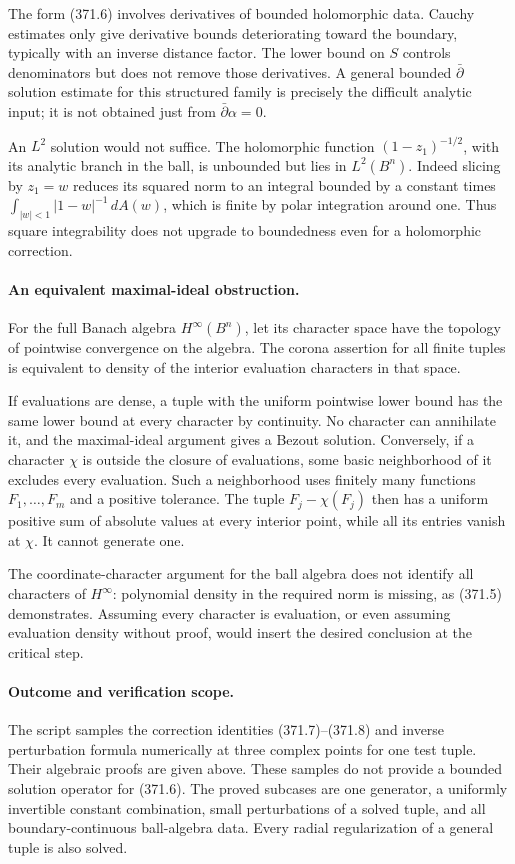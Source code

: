 \documentclass[11pt]{article}
\begin{document}
The form (371.6) involves derivatives of bounded holomorphic data.
Cauchy estimates only give derivative bounds deteriorating toward
the boundary, typically with an inverse distance factor. The
lower bound on $S$ controls denominators but does not remove
those derivatives. A general bounded $\bar\partial$ solution
estimate for this structured family is precisely the difficult
analytic input; it is not obtained just from
$\bar\partial\alpha=0$.

An $L^2$ solution would not suffice. The holomorphic function
$(1-z_1)^{-1/2}$, with its analytic branch in the ball, is
unbounded but lies in $L^2(B^n)$. Indeed slicing by $z_1=w$
reduces its squared norm to an integral bounded by a constant
times $\int_{|w|<1}|1-w|^{-1}\,dA(w)$, which is finite by
polar integration around one. Thus square integrability does
not upgrade to boundedness even for a holomorphic correction.

\paragraph{An equivalent maximal-ideal obstruction.}
For the full Banach algebra $H^\infty(B^n)$, let its character
space have the topology of pointwise convergence on the algebra.
The corona assertion for all finite tuples is equivalent to
density of the interior evaluation characters in that space.

If evaluations are dense, a tuple with the uniform pointwise
lower bound has the same lower bound at every character by
continuity. No character can annihilate it, and the maximal-ideal
argument gives a Bezout solution. Conversely, if a character
$\chi$ is outside the closure of evaluations, some basic
neighborhood of it excludes every evaluation. Such a neighborhood
uses finitely many functions $F_1,\ldots,F_m$ and a positive
tolerance. The tuple $F_j-\chi(F_j)$ then has a uniform positive
sum of absolute values at every interior point, while all its
entries vanish at $\chi$. It cannot generate one.

The coordinate-character argument for the ball algebra does not
identify all characters of $H^\infty$: polynomial density in
the required norm is missing, as (371.5) demonstrates. Assuming
every character is evaluation, or even assuming evaluation
density without proof, would insert the desired conclusion at
the critical step.

\paragraph{Outcome and verification scope.}
The script samples the correction identities (371.7)--(371.8)
and inverse perturbation formula numerically at three complex points
for one test tuple. Their algebraic proofs are given above.
These samples do not
provide a bounded solution operator for (371.6). The proved
subcases are one generator, a uniformly invertible constant
combination, small perturbations of a solved tuple, and all
boundary-continuous ball-algebra data. Every radial regularization
of a general tuple is also solved.
\end{document}
